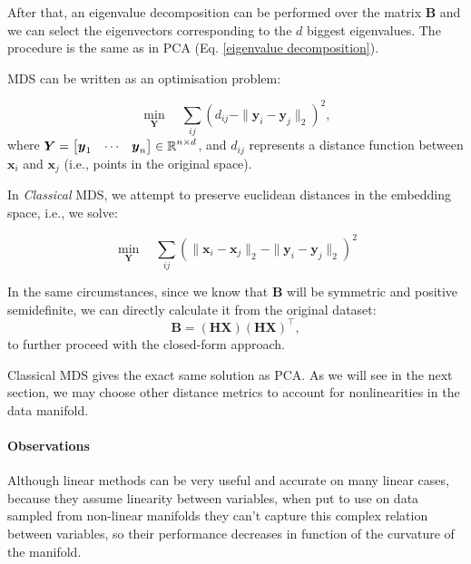         After that, an eigenvalue decomposition can be performed over the matrix $\bm{B}$ and we can select the eigenvectors corresponding to the $d$ biggest eigenvalues. The procedure is the same as in PCA (Eq. \ref{eigenvalue decomposition}).
        
        MDS can be written as an optimisation problem:

        \begin{equation}
            \min_{\bm{Y}} \quad \sum_{ij} \left( 
            d_{ij} - \| \bm{y}_i - \bm{y}_j \|_2
            \right)^2,
            \label{MDS formulation problem}
        \end{equation}
        where $\boldsymbol{Y}=\begin{bmatrix}\boldsymbol{y}_1 & \cdots & \boldsymbol{y}_n\end{bmatrix}\in\operatorname{\mathbb{R}}^{n\times d}$, and $d_{ij}$ represents a distance function between $\bm{x}_i$ and $\bm{x}_j$ (i.e., points in the original space).

        In \textit{Classical} MDS, we attempt to preserve euclidean distances in the embedding space, i.e., we solve:
        
        \begin{equation}
            \min_{\bm{Y}} \quad \sum_{ij} \left( 
            \|\bm{x}_i - \bm{x}_j \|_2 - \| \bm{y}_i - \bm{y}_j \|_2
            \right)^2
            \label{classical MDS formulation problem}
        \end{equation}

        In the same circumstances, since we know that $\bm{B}$ will be symmetric and positive semidefinite, we can directly calculate it from the original dataset:
        \begin{equation}
            \bm{B} = \left( \bm{HX} \right) \left( \bm{HX} \right)^\top,
        \end{equation}
        to further proceed with the closed-form approach.

        Classical MDS gives the exact same solution as PCA. As we will see in the next section, we may choose other distance metrics to account for nonlinearities in the data manifold.
        
        \paragraph{Observations}
        Although linear methods can be very useful and accurate on many linear cases, because they assume linearity between variables, when put to use on data sampled from non-linear manifolds they can't capture this complex relation between variables, so their performance decreases in function of the curvature of the manifold.

